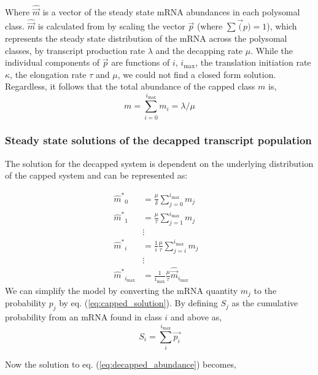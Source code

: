 \documentclass[a4,center,fleqn,nocrop]{NAR}
\newcommand{\imax}{\ensuremath{{i_{\max}}}\xspace}
\newcommand{\mhat}{\ensuremath{\hat{m}}\xspace}
\newcommand{\mhatstar}{\ensuremath{\mhat^{*}}\xspace}
\newcommand{\mvec}{\ensuremath{\vec{m}}\xspace}
\newcommand{\mvechat}{\ensuremath{\hat{\mvec}}\xspace}
\newcommand{\msum}{\ensuremath{m}\xspace}
\begin{document}
Where \mvechat is a vector of the steady state mRNA abundances in each polysomal class.
\mvechat is calculated from by scaling  the vector $\vec{p}$ (where $\sum \vec(p) = 1$), which represents the steady state distribution of the mRNA across the polysomal classes, by transcript production rate $\lambda$ and the decapping rate $\mu$.
While the individual components of $\vec{p}$ are functions of $i$, \imax, the translation initiation rate $\kappa$, the elongation rate $\tau$ and $\mu$, we could not find a closed form solution.
Regardless, it follows that the total abundance of the capped class \msum is,
\begin{equation}\label{eq:capped_sum}
\msum = \sum_{i = 0} ^\imax m_i = \lambda/\mu
\end{equation}

\subsubsection{Steady state solutions of the decapped transcript population}

The solution for the decapped system is dependent on the underlying distribution of the capped system and can be represented as:

\begin{align}\label{eq:decapped_abundance}
\mhatstar_0  &= \frac{\mu}{\delta}\sum_{j=0}^{\imax}m_{j} \nonumber \\
\mhatstar_1  &= \frac{\mu}{\tau}\sum_{j=1}^{\imax}m_{j}  \nonumber \\
& \vdots & \nonumber \\
\mhatstar_i  &= \frac{1}{i}\frac{\mu}{\tau}\sum_{j=i}^{\imax}m_{j}  \nonumber \\
& \vdots & \nonumber \\
\mhatstar_{\imax}  &= \frac{1}{\imax}\frac{\mu}{\tau} \mvechat_{\imax}   \nonumber
\end{align}
We can simplify the model by converting the mRNA quantity $m_{j}$ to the probability $p_{j}$ by eq. (\ref{eq:capped_solution}).
By defining $S_{j}$ as the cumulative probability from an mRNA found in class $i$ and above as,
\begin{equation}
		S_{i} = \sum_{i}^{\imax}\vec{p_{i}}
\end{equation}

Now the solution to eq. (\ref{eq:decapped_abundance}) becomes,
\end{document}
